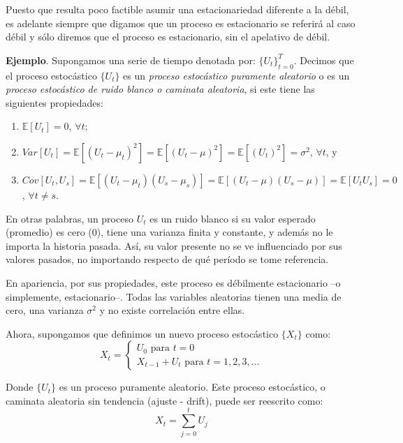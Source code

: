 \documentclass[
]{book}
\begin{document}
Puesto que resulta poco factible asumir una estacionariedad diferente a la débil, es adelante siempre que digamos que un proceso es estacionario se referirá al caso débil y sólo diremos que el proceso es estacionario, sin el apelativo de débil.

\textbf{Ejemplo}. Supongamos una serie de tiempo denotada por: \(\{U_t\}^T_{t = 0}\). Decimos que el proceso estocástico \(\{U_t\}\) es un \emph{proceso estocástico puramente aleatorio} o es un \emph{proceso estocástico de ruido blanco o caminata aleatoria}, si este tiene las siguientes propiedades:

\begin{enumerate}
\def\labelenumi{\arabic{enumi}.}
\item
  \(\mathbb{E}[U_t] = 0\), \(\forall t\);
\item
  \(Var[U_t] = \mathbb{E}[(U_t - \mu_t)^2] = \mathbb{E}[(U_t - \mu)^2] = \mathbb{E}[(U_t)^2] = \sigma^2\), \(\forall t\), y
\item
  \(Cov[U_t,U_s] = \mathbb{E}[(U_t - \mu_t)(U_s - \mu_s)] = \mathbb{E}[(U_t - \mu)(U_s - \mu)] = \mathbb{E}[U_t U_s] = 0\), \(\forall t \neq s\).
\end{enumerate}

En otras palabras, un proceso \(U_t\) es un ruido blanco si su valor esperado (promedio) es cero (0), tiene una varianza finita y constante, y además no le importa la historia pasada. Así, su valor presente no se ve influenciado por sus valores pasados, no importando respecto de qué período se tome referencia.

En apariencia, por sus propiedades, este proceso es débilmente estacionario --o simplemente, estacionario--. Todas las variables aleatorias tienen una media de cero, una varianza \(\sigma^2\) y no existe correlación entre ellas.

Ahora, supongamos que definimos un nuevo proceso estocástico \(\{X_t\}\) como:
\begin{equation}
    X_t = \left\{ \begin{array}{l} U_0  \mbox{ para } t = 0 \\ X_{t-1} + U_t \mbox{ para } t = 1, 2, 3, \ldots \end{array}\right.
    \label{eq:em1}
\end{equation}

Donde \(\{ U_t \}\) es un proceso puramente aleatorio. Este proceso estocástico, o caminata aleatoria sin tendencia (ajuste - drift), puede ser reescrito como:
\begin{equation}
    X_t = \sum^t_{j = 0} U_j
    \label{eq:em2}
\end{equation}
\end{document}
